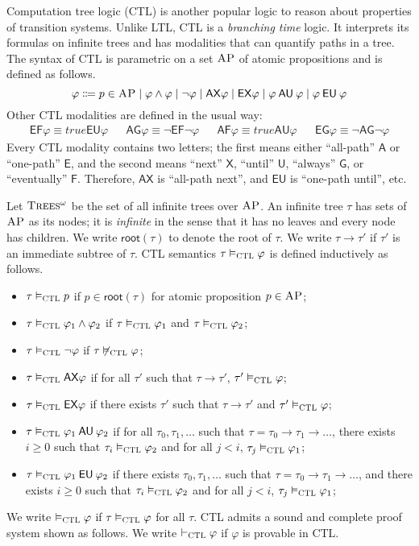 \documentclass[letter,12pt]{article}
\newcommand{\AP}{\textsc{AP}}
\newcommand{\true}{\mathit{true}}
\newcommand{\AAA}{{\mathsf{A}}}
\newcommand{\EEE}{{\mathsf{E}}}
\newcommand{\XX}{{\mathsf{X}}}
\newcommand{\UU}{\mathbin{\mathsf{U}}}
\newcommand{\FF}{{\mathsf{F}}}
\newcommand{\GG}{{\mathsf{G}}}
\newcommand{\AG}{{\mathsf{AG}}}
\newcommand{\EG}{{\mathsf{EG}}}
\newcommand{\AF}{{\mathsf{AF}}}
\newcommand{\EF}{{\mathsf{EF}}}
\newcommand{\AX}{\mathsf{AX}}
\newcommand{\AU}{\mathbin{\mathsf{AU}}}
\newcommand{\EU}{\mathbin{\mathsf{EU}}}
\newcommand{\EX}{\mathsf{EX}}
\newcommand{\rt}{\mathsf{root}}
\newcommand{\infTrees}{\textsc{Trees$^\omega$}\xspace}
\newcommand{\CTL}{{\textsc{CTL}}}
\begin{document}
Computation tree logic (CTL) is another popular logic
to reason about properties of transition systems.
Unlike LTL, CTL is a \emph{branching time} logic.
It interprets its formulas on infinite trees
and has modalities that can quantify paths in a tree.
The syntax of CTL is parametric on a set $\AP$ of atomic propositions and
is defined as follows.
$$
\varphi \Coloneqq p \in \AP \mid
\varphi \wedge \varphi \mid
\neg \varphi \mid
\AX \varphi \mid
\EX \varphi \mid
\varphi \AU \varphi \mid
\varphi \EU \varphi
$$
Other CTL modalities are defined in the usual way:
\begin{align*}
\EF \varphi \equiv \true \EU \varphi &&
\AG \varphi \equiv \neg \EF \neg \varphi &&
\AF \varphi \equiv \true \AU \varphi &&
\EG \varphi \equiv \neg \AG \neg \varphi
\end{align*}
Every CTL modality contains two letters;
the first means either ``all-path'' $\AAA$ or ``one-path'' $\EEE$,
and the second means ``next'' $\XX$, ``until'' $\UU$, ``always'' $\GG$,
or ``eventually'' $\FF$.
Therefore, $\AX$ is ``all-path next'', and $\EU$ is ``one-path until'', etc.

Let $\infTrees$ be the set of all infinite trees over $\AP$.
An infinite tree $\tau$ has sets of $\AP$ as its nodes;
it is \emph{infinite} in the sense that it has no leaves
and every node has children.
We write $\rt(\tau)$ to denote the root of $\tau$.
We write $\tau \to \tau'$ 
if $\tau'$ is an immediate subtree of $\tau$.
CTL semantics $\tau \vDash_\CTL \varphi$ is defined inductively as follows.
\begin{itemize}
\item $\tau \vDash_\CTL p$ if $p \in \rt(\tau)$ for atomic proposition $p \in \AP$;
\item $\tau \vDash_\CTL \varphi_1 \wedge \varphi_2$ if
      $\tau \vDash_\CTL \varphi_1$ and $\tau \vDash_\CTL \varphi_2$;
\item $\tau \vDash_\CTL \neg \varphi$ if
      $\tau \not\vDash_\CTL \varphi$;
\item $\tau \vDash_\CTL \AX \varphi$ if
      for all $\tau'$ such that $\tau \to \tau'$, $\tau' \vDash_\CTL \varphi$;
\item $\tau \vDash_\CTL \EX \varphi$ if
	  there exists $\tau'$ such that $\tau \to \tau'$ and $\tau' \vDash_\CTL \varphi$;
\item $\tau \vDash_\CTL \varphi_1 \AU \varphi_2$ if
      for all $\tau_0,\tau_1,\dots$ such that
      $\tau = \tau_0 \to \tau_1 \to \dots$,
      there exists $i \ge 0$ such that
      $\tau_i \vDash_\CTL \varphi_2$
      and for all $j < i$, $\tau_j \vDash_\CTL \varphi_1$;
\item $\tau \vDash_\CTL \varphi_1 \EU \varphi_2$ if
      there exists $\tau_0,\tau_1,\dots$ such that
      $\tau = \tau_0 \to \tau_1 \to \dots$, and
      there exists $i \ge 0$ such that
      $\tau_i \vDash_\CTL \varphi_2$
      and for all $j < i$, $\tau_j \vDash_\CTL \varphi_1$;
\end{itemize}
We write $\vDash_\CTL \varphi$ if $\tau \vDash_\CTL\varphi$ for all $\tau$.
CTL admits a sound and complete proof system shown as follows.
We write $\vdash_\CTL\varphi$ if $\varphi$ is provable in CTL.
\end{document}
